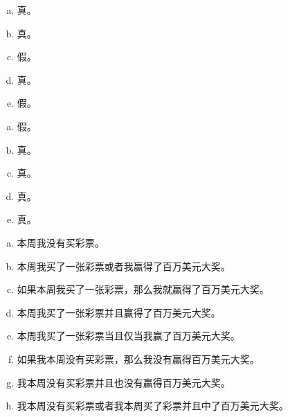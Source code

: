 {{        \begin{practices}
            \begin{enumerate}[a)]
                \item 真。
                \item 真。
                \item 假。
                \item 真。
                \item 假。
            \end{enumerate}
        \end{practices}

        \begin{practices}
            \begin{enumerate}[a)]
                \item 假。
                \item 真。
                \item 真。
                \item 真。
                \item 真。
            \end{enumerate}
        \end{practices}

        \begin{practices}
            \begin{enumerate}[a)]
                \item 本周我没有买彩票。
                \item 本周我买了一张彩票或者我赢得了百万美元大奖。
                \item 如果本周我买了一张彩票，那么我就赢得了百万美元大奖。
                \item 本周我买了一张彩票并且赢得了百万美元大奖。
                \item 本周我买了一张彩票当且仅当我赢了百万美元大奖。
                \item 如果我本周没有买彩票，那么我没有赢得百万美元大奖。
                \item 我本周没有买彩票并且也没有赢得百万美元大奖。
                \item 我本周没有买彩票或者我本周买了彩票并且中了百万美元大奖。
            \end{enumerate}
        \end{practices}

}}
